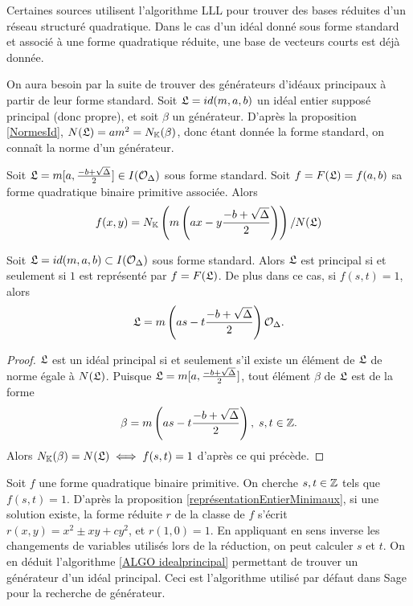 \begin{Rem}
	Certaines sources \cite{Pegasis} utilisent l'algorithme LLL pour trouver des bases réduites d'un réseau structuré quadratique. Dans le cas d'un idéal donné sous forme standard et associé à une forme quadratique réduite, une base de vecteurs courts est déjà donnée. 
\end{Rem}

On aura besoin par la suite de trouver des générateurs d'idéaux principaux à partir de leur forme standard. Soit $\mathfrak{L} = id(m,a,b)$ un idéal entier supposé principal (donc propre), et soit $\beta$ un générateur. D'après la proposition \ref{NormesId}, $N(\mathfrak{L}) = am^2 = N_{\mathbb{K}}(\beta)$, donc étant donnée la forme standard, on connaît la norme d'un générateur.  

\begin{Prop}
	Soit $\mathfrak{L} = m[a , \frac{-b + \sqrt{\Delta}}{2}]\in I(\mathcal{O}_{\Delta})$ sous forme standard. Soit $f = F(\mathfrak{L}) = f(a,b)$ sa forme quadratique binaire primitive associée. Alors 
	\begin{equation*}
		f(x,y) = N_{\mathbb{K}}\left( m\left( ax - y\frac{-b + \sqrt{\Delta}}{2}\right) \right) / N(\mathfrak{L})
	\end{equation*}
\end{Prop}


\begin{Coro}
	Soit $\mathfrak{L} = id(m,a,b)\subset I(\mathcal{O}_{\Delta})$ sous forme standard. Alors $\mathfrak{L}$ est principal si et seulement si $1$ est représenté par $f = F(\mathfrak{L})$. De plus dans ce cas, si $f(s,t) = 1$, alors
	\begin{equation*}
		\mathfrak{L} = m\left( as - t\frac{-b + \sqrt{\Delta}}{2}\right) \mathcal{O}_{\Delta}.
	\end{equation*}
\end{Coro}

\begin{proof}
	$\mathfrak{L}$ est un idéal principal si et seulement s'il existe un élément de $\mathfrak{L}$ de norme égale à $N(\mathfrak{L})$. Puisque $\mathfrak{L} = m[a , \frac{-b + \sqrt{\Delta}}{2}]$, tout élément $\beta$ de $\mathfrak{L}$ est de la forme
	\begin{equation*}
		\beta = m\left( as - t\frac{-b + \sqrt{\Delta}}{2}\right),\; s,t\in\mathbb{Z}.
	\end{equation*}
	Alors $N_{\mathbb{K}}(\beta) = N(\mathfrak{L}) \iff f(s,t) = 1$ d'après ce qui précède.
\end{proof}

Soit $f$ une forme quadratique binaire primitive. On cherche $s, t\in\mathbb{Z}$ tels que $f(s,t) = 1$. D'après la proposition \ref{représentationEntierMinimaux}, si une solution existe, la forme réduite $r$ de la classe de $f$ s'écrit $r(x,y) = x^2 \pm xy + cy^2$, et $r(1,0) = 1$. En appliquant en sens inverse les changements de variables utilisés lors de la réduction, on peut calculer $s$ et $t$. On en déduit l'algorithme \ref{ALGO idealprincipal} permettant de trouver un générateur d'un idéal principal. Ceci est l'algorithme utilisé par défaut dans Sage pour la recherche de générateur.  


